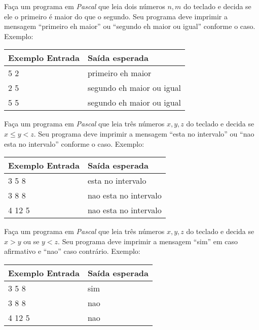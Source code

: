 \item Faça um programa em \emph{Pascal} que leia dois números $n, m$ do teclado
e decida se ele o primeiro é maior do que o segundo. Seu programa deve imprimir
a mensagem ``primeiro eh maior'' ou ``segundo eh maior ou igual'' conforme o caso. Exemplo:

\begin{center}
\begin{tabular}{|l|l|} \hline
Exemplo Entrada & Saída esperada \\ \hline
5 2             & primeiro eh maior               \\ \hline
2 5             & segundo eh maior ou igual       \\ \hline
5 5             & segundo eh maior ou igual       \\ \hline
\end{tabular}
\end{center}

\item Faça um programa em \emph{Pascal} que leia três números $x, y, z$ 
do teclado e decida se $x \le y < z$. 
Seu programa deve imprimir a mensagem ``esta no intervalo'' 
ou ``nao esta no intervalo'' conforme o caso. Exemplo:

\begin{center}
\begin{tabular}{|l|l|} \hline
Exemplo Entrada & Saída esperada \\ \hline
3 5 8           & esta no intervalo \\ \hline
3 8 8           & nao esta no intervalo \\ \hline
4 12 5          & nao esta no intervalo \\ \hline
\end{tabular}
\end{center}

\item Faça um programa em \emph{Pascal} que leia três números $x, y, z$ 
do teclado e decida se $x > y$ ou se $y < z$. 
Seu programa deve imprimir a mensagem ``sim'' em caso afirmativo e  
``nao'' caso contrário. Exemplo:

\begin{center}
\begin{tabular}{|l|l|} \hline
Exemplo Entrada & Saída esperada \\ \hline
3 5 8                & sim                \\ \hline
3 8 8                & nao               \\ \hline
4 12 5               & nao               \\ \hline
\end{tabular}
\end{center}

